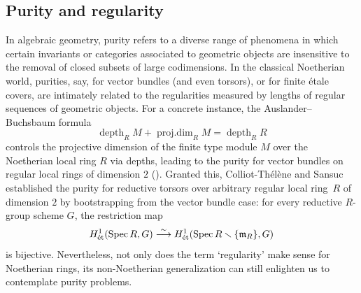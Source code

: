 \documentclass[JEP,XML,SOM,Unicode,published]{cedram}
\let\backslash\smallsetminus
\newcommand{\fm}{\mathfrak{m}}
\newcommand{\isoto}{\overset{\sim}{\longrightarrow}}
\newcommand{\et}{\textup{ét}}
\DeclareMathOperator{\Spec}{Spec}
\DeclareMathOperator{\pd}{proj.dim}
\DeclareMathOperator{\depth}{depth}
\theoremstyle{plain}
\theoremstyle{definition}
\begin{document}
\subsection{Purity and regularity}
In algebraic geometry, purity refers to a diverse range of phenomena in which certain invariants or categories associated to geometric objects are insensitive to the removal of closed subsets of large codimensions.
In the classical Noetherian world, purities, say, for vector bundles (and even torsors), or for finite étale covers, are intimately related to the regularities measured by lengths of regular sequences of geometric objects.
For a concrete instance, the Auslander--Buchsbaum formula \cite[Th.\,3.7]{AB57}
\[
\depth_RM+\pd_RM=\depth_RR
\]
controls the projective dimension of the finite type module $M$ over the Noetherian local ring $R$ via depths, leading to the purity for vector bundles on regular local rings of dimension $2$ (\cite[Prop.\,2]{Sam64}).
Granted this, Colliot-Thélène and Sansuc \cite[Th.\,6.13]{CTS79} established the purity for reductive torsors over arbitrary regular local ring~$R$ of dimension $2$ by bootstrapping from the vector bundle case: for every reductive $R$-group scheme $G$, the restriction map
\[
H^1_{\et}(\Spec R,G)\isoto H^1_{\et}(\Spec R\backslash \{\fm_R\},G)
\]
 is bijective. Nevertheless, not only does the term `regularity' make sense for Noetherian rings, its non-Noetherian generalization can still enlighten us to contemplate purity problems.
\end{document}
